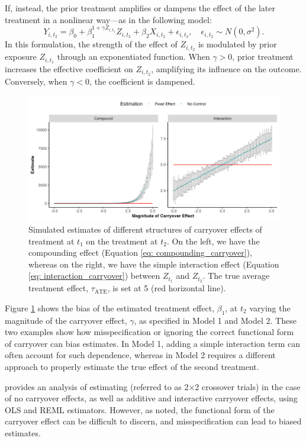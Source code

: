 If, instead, the prior treatment amplifies or dampens the effect of the later treatment in a nonlinear way—as in the following model:
\begin{equation}
\label{eq: compounding_carryover}
Y_{i,t_2} 
= \beta_0 
+ \beta_1^{1 + \gamma Z_{i,t_1}} Z_{i,t_2} 
+ \beta_2 X_{i,t_2} 
+ \epsilon_{i, t_2}, 
\quad \epsilon_{i, t_2} \sim N(0,\sigma^2).
\end{equation}
In this formulation, the strength of the effect of \( Z_{i,t_2} \) is modulated by prior exposure \( Z_{i,t_1} \) through an exponentiated function. When \( \gamma > 0 \), prior treatment increases the effective coefficient on \( Z_{i,t_2} \), amplifying its influence on the outcome. Conversely, when \( \gamma < 0 \), the coefficient is dampened. 


\begin{figure}[h]
    \centering
    \includegraphics[width=0.95\linewidth]{Figures/CarryoverEffect.png}
    \caption{Simulated estimates of different structures of carryover effects of treatment at $t_1$ on the treatment at $t_2$. On the left, we have the compounding effect (Equation \ref{eq: compounding_carryover}), whereas on the right, we have the simple interaction effect (Equation \ref{eq: interaction_carryover}) between $Z_{t_1}$ and $Z_{t_2}$. The true average treatment effect, $\tau_{\text{ATE}}$, is set at 5 (red horizontal line).}
    \label{fig:simulation_control_carryover}
\end{figure}

Figure \ref{fig:simulation_control_carryover} shows the bias of the estimated treatment effect, $\beta_1$, at $t_2$ varying the magnitude of the carryover effect, $\gamma$, as specified in Model 1 and Model 2. These two examples show how misspecification or ignoring the correct functional form of carryover can bias estimates. In Model 1, adding a simple interaction term can often account for such dependence, whereas in Model 2 requires a different approach to properly estimate the true effect of the second treatment.

\cite{23_AnalysisOfCrossoverTrial} provides an analysis of estimating \cwsd{} (referred to as 2×2 crossover trials) in the case of no carryover effects, as well as additive and interactive carryover effects, using OLS and REML estimators. However, as noted, the functional form of the carryover effect can be difficult to discern, and misspecification can lead to biased estimates.
